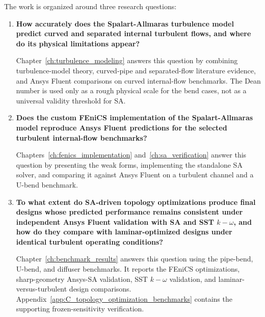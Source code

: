 The work is organized around three research questions:
\begin{enumerate}
	\item \textbf{How accurately does the Spalart-Allmaras turbulence model predict curved and separated internal turbulent flows, and where do its physical limitations appear?}

	Chapter~\ref{ch:turbulence_modeling} answers this question by combining turbulence-model theory, curved-pipe and separated-flow literature evidence, and Ansys Fluent comparisons on curved internal-flow benchmarks. The Dean number is used only as a rough physical scale for the bend cases, not as a universal validity threshold for SA.

	\item \textbf{Does the custom FEniCS implementation of the Spalart-Allmaras model reproduce Ansys Fluent predictions for the selected turbulent internal-flow benchmarks?}

	Chapters~\ref{ch:fenics_implementation} and~\ref{ch:sa_verification} answer this question by presenting the weak forms, implementing the standalone SA solver, and comparing it against Ansys Fluent on a turbulent channel and a U-bend benchmark.

	\item \textbf{To what extent do SA-driven topology optimizations produce final designs whose predicted performance remains consistent under independent Ansys Fluent validation with SA and SST $k-\omega$, and how do they compare with laminar-optimized designs under identical turbulent operating conditions?}

	Chapter~\ref{ch:benchmark_results} answers this question using the pipe-bend, U-bend, and diffuser benchmarks. It reports the FEniCS optimizations, sharp-geometry Ansys-SA validation, SST $k-\omega$ validation, and laminar-versus-turbulent design comparisons. Appendix~\ref{app:C_topology_optimization_benchmarks} contains the supporting frozen-sensitivity verification.
\end{enumerate}


